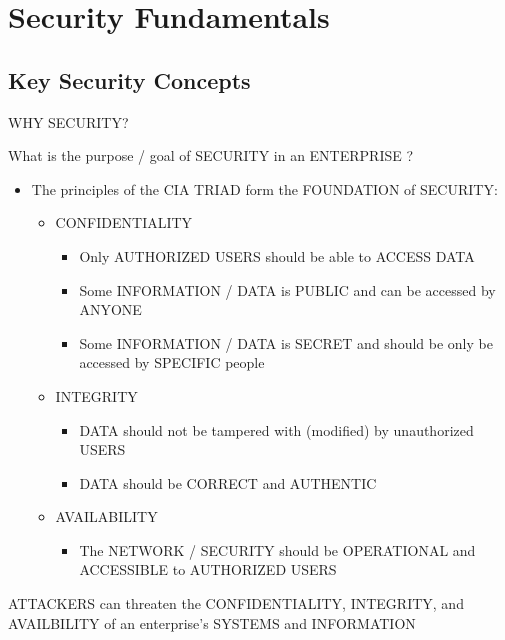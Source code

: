 \chapter{Security Fundamentals}\label{security-fundamentals}

\section{Key Security Concepts}\label{key-security-concepts}

WHY SECURITY?

What is the purpose / goal of SECURITY in an ENTERPRISE ?

\begin{itemize}
\tightlist
\item
  The principles of the CIA TRIAD form the FOUNDATION of SECURITY:

  \begin{itemize}
  \tightlist
  \item
    CONFIDENTIALITY

    \begin{itemize}
    \tightlist
    \item
      Only AUTHORIZED USERS should be able to ACCESS DATA
    \item
      Some INFORMATION / DATA is PUBLIC and can be accessed by ANYONE
    \item
      Some INFORMATION / DATA is SECRET and should be only be accessed
      by SPECIFIC people
    \end{itemize}
  \item
    INTEGRITY

    \begin{itemize}
    \tightlist
    \item
      DATA should not be tampered with (modified) by unauthorized USERS
    \item
      DATA should be CORRECT and AUTHENTIC
    \end{itemize}
  \item
    AVAILABILITY

    \begin{itemize}
    \tightlist
    \item
      The NETWORK / SECURITY should be OPERATIONAL and ACCESSIBLE to
      AUTHORIZED USERS
    \end{itemize}
  \end{itemize}
\end{itemize}

ATTACKERS can threaten the CONFIDENTIALITY, INTEGRITY, and AVAILBILITY
of an enterprise's SYSTEMS and INFORMATION


